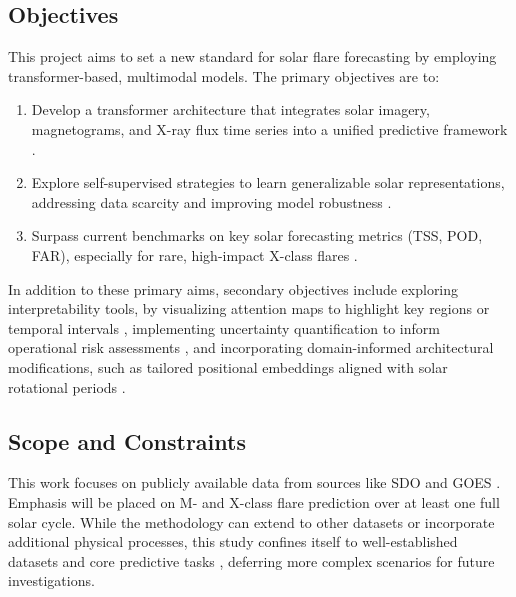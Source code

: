 \subsection{Objectives}
This project aims to set a new standard for solar flare forecasting by employing transformer-based, multimodal models. The primary objectives are to:

\begin{enumerate}
\item Develop a transformer architecture that integrates solar imagery, magnetograms, and X-ray flux time series into a unified predictive framework \cite{RefWorks:RefID:2-abduallah2023operational, RefWorks:RefID:12-zheng2023comparative}.
\item Explore self-supervised strategies to learn generalizable solar representations, addressing data scarcity and improving model robustness \cite{RefWorks:RefID:21-fedus2022switch, RefWorks:RefID:29-hoffmanntraining}.
\item Surpass current benchmarks on key solar forecasting metrics (TSS, POD, FAR), especially for rare, high-impact X-class flares \cite{RefWorks:RefID:2-abduallah2023operational, RefWorks:RefID:14-hayes2021solar}.
\end{enumerate}

In addition to these primary aims, secondary objectives include exploring interpretability tools, by visualizing attention maps to highlight key regions or temporal intervals \cite{RefWorks:RefID:2-abduallah2023operational}, implementing uncertainty quantification to inform operational risk assessments \cite{RefWorks:RefID:2-abduallah2023operational}, and incorporating domain-informed architectural modifications, such as tailored positional embeddings aligned with solar rotational periods \cite{RefWorks:RefID:15-harra2016characteristics, RefWorks:RefID:7-schrijver2009driving}.

\subsection{Scope and Constraints}
This work focuses on publicly available data from sources like SDO and GOES \cite{RefWorks:RefID:13-yıldız2023effect, RefWorks:RefID:6-omatolaimpacts}. Emphasis will be placed on M- and X-class flare prediction over at least one full solar cycle. While the methodology can extend to other datasets or incorporate additional physical processes, this study confines itself to well-established datasets and core predictive tasks \cite{RefWorks:RefID:1-gettelman1997future}, deferring more complex scenarios for future investigations.
